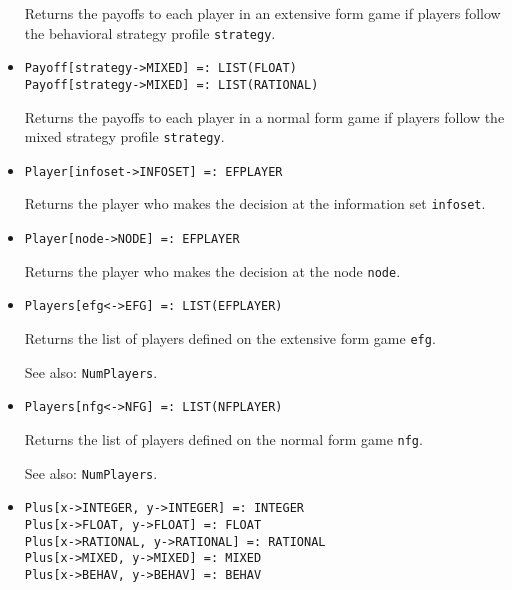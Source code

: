\begin{itemize}
\bd
Returns the payoffs to each player in an extensive form game
if players follow the behavioral strategy profile \verb+strategy+.
\ed

\item
\protect \large \begin{verbatim}
Payoff[strategy->MIXED] =: LIST(FLOAT)
Payoff[strategy->MIXED] =: LIST(RATIONAL)
\end{verbatim}\normalsize

\bd
Returns the payoffs to each player in a normal form game
if players follow the mixed strategy profile \verb+strategy+.
\ed

\item
\protect \large \begin{verbatim}
Player[infoset->INFOSET] =: EFPLAYER
\end{verbatim}\normalsize

\bd
Returns the player who makes the decision at the information
set \verb+infoset+.
\ed

\item
\protect \large \begin{verbatim}
Player[node->NODE] =: EFPLAYER
\end{verbatim}\normalsize

\bd
Returns the player who makes the decision at the node
\verb+node+.
\ed

\item
\protect \large \begin{verbatim}
Players[efg<->EFG] =: LIST(EFPLAYER)
\end{verbatim} \normalsize

\bd
Returns the list of players defined on the extensive form
game \verb+efg+.
\item
[See also:] {\tt NumPlayers}.
\ed

\item
\protect \large \begin{verbatim}
Players[nfg<->NFG] =: LIST(NFPLAYER)
\end{verbatim} \normalsize

\bd
Returns the list of players defined on the normal form
game \verb+nfg+.
\item
[See also:] {\tt NumPlayers}.
\ed

\item 
\protect \large \begin{verbatim}
Plus[x->INTEGER, y->INTEGER] =: INTEGER
Plus[x->FLOAT, y->FLOAT] =: FLOAT
Plus[x->RATIONAL, y->RATIONAL] =: RATIONAL
Plus[x->MIXED, y->MIXED] =: MIXED
Plus[x->BEHAV, y->BEHAV] =: BEHAV
\end{verbatim} \normalsize


\end{itemize}
